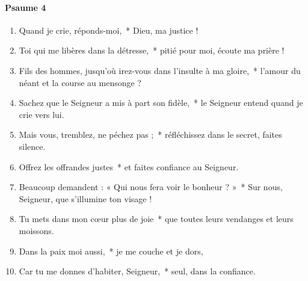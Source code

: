 \documentclass[twoside]{article}
\begin{document}
\begin{paracol}[1]{2}
\paragraph{Psaume 4}
\begin{enumerate}[wide, itemsep=0mm, labelwidth=!, labelindent=0pt, label=\color{gregoriocolor}\theenumi]
\item Quand je crie, réponds-moi,~* Dieu, ma justice !
\item Toi qui me libères dans la détresse,~* pitié pour moi, écoute ma prière !
\item Fils des hommes, jusqu'où irez-vous dans l'insulte à ma gloire,~* l'amour du néant et la course au mensonge ?
\item Sachez que le Seigneur a mis à part son fidèle,~* le Seigneur entend quand je crie vers lui.
\item Mais vous, tremblez, ne péchez pas ;~* réfléchissez dans le secret, faites silence.
\item Offrez les offrandes justes~* et faites confiance au Seigneur.
\item Beaucoup demandent : « Qui nous fera voir le bonheur ? »~* Sur nous, Seigneur, que s'illumine ton visage !
\item Tu mets dans mon cœur plus de joie~* que toutes leurs vendanges et leurs moissons.
\item Dans la paix moi aussi,~* je me couche et je dors,
\item Car tu me donnes d'habiter, Seigneur,~* seul, dans la confiance.
\end{enumerate}
\switchcolumn*


\end{paracol}
\end{document}
